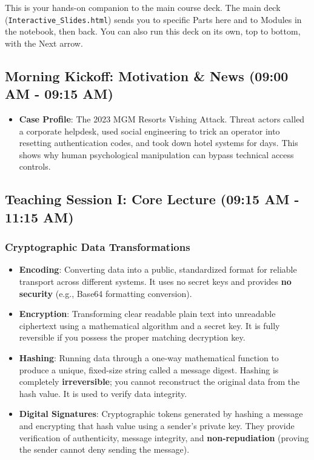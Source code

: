 \documentclass[12pt,openany]{book}
\begin{document}
This is your hands-on companion to the main course deck. The main deck (\texttt{Interactive\_Slides.html}) sends you to specific Parts here and to Modules in the notebook, then back. You can also run this deck on its own, top to bottom, with the Next arrow.

\medskip

\subsection*{Morning Kickoff: Motivation \& News (09:00 AM - 09:15 AM)}


\begin{itemize}

  \item \textbf{Case Profile}: The 2023 MGM Resorts Vishing Attack. Threat actors called a corporate helpdesk, used social engineering to trick an operator into resetting authentication codes, and took down hotel systems for days. This shows why human psychological manipulation can bypass technical access controls.

\end{itemize}

\medskip

\subsection*{Teaching Session I: Core Lecture (09:15 AM - 11:15 AM)}


\subsubsection*{Cryptographic Data Transformations}


\begin{itemize}

  \item \textbf{Encoding}: Converting data into a public, standardized format for reliable transport across different systems. It uses no secret keys and provides \textbf{no security} (e.g., Base64 formatting conversion).

  \item \textbf{Encryption}: Transforming clear readable plain text into unreadable ciphertext using a mathematical algorithm and a secret key. It is fully reversible if you possess the proper matching decryption key.

  \item \textbf{Hashing}: Running data through a one-way mathematical function to produce a unique, fixed-size string called a message digest. Hashing is completely \textbf{irreversible}; you cannot reconstruct the original data from the hash value. It is used to verify data integrity.

  \item \textbf{Digital Signatures}: Cryptographic tokens generated by hashing a message and encrypting that hash value using a sender's private key. They provide verification of authenticity, message integrity, and \textbf{non-repudiation} (proving the sender cannot deny sending the message).

\end{itemize}
\end{document}
